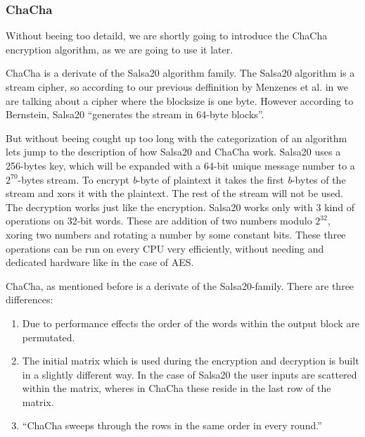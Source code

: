 \documentclass[12pt,a4paper,titlepage,oneside]{scrartcl}
\begin{document}
\subsubsection{ChaCha}
Without beeing too detaild, we are shortly going to introduce the ChaCha encryption algorithm, as we are going to use it later.

ChaCha is a derivate of the Salsa20 algorithm family. 
The Salsa20 algorithm is a stream cipher, so according to our previous deffinition by Menzenes et al. in \cite{menezes1996handbook} we are talking about a cipher where the blocksize is one byte.
However according to Bernstein, Salsa20 ``generates the stream in 64-byte blocks''. \cite{bernstein2008salsa20}

But without beeing cought up too long with the categorization of an algorithm lets jump to the description of how Salsa20 and ChaCha work.
Salsa20 uses a 256-bytes key, which will be expanded with a 64-bit unique message number to a \begin{math} 2^{70} \end{math}-bytes stream.
To encrypt \textit{b}-byte of plaintext it takes the first \textit{b}-bytes of the stream and xors it with the plaintext.
The rest of the stream will not be used.
The decryption works just like the encryption.
Salsa20 works only with 3 kind of operations on 32-bit words.
These are addition of two numbers modulo \begin{math} 2^{32} \end{math}, xoring two numbers and rotating a number by some constant bits.
These three operations can be run on every CPU very efficiently, without needing and dedicated hardware like in the case of AES. \cite{bernstein2008salsa20}

ChaCha, as mentioned before is a derivate of the Salsa20-family.
There are three differences:
\begin{enumerate}
  \item Due to performance effects the order of the words within the output block are permutated.
  \item The initial matrix which is used during the encryption and decryption is built in a slightly different way.
    In the case of Salsa20 the user inputs are scattered within the matrix, wheres in ChaCha these reside in the last row of the matrix.
  \item ``ChaCha sweeps through the rows in the same order in every round.''
\end{enumerate}
\cite{bernstein2008chacha}
\end{document}
